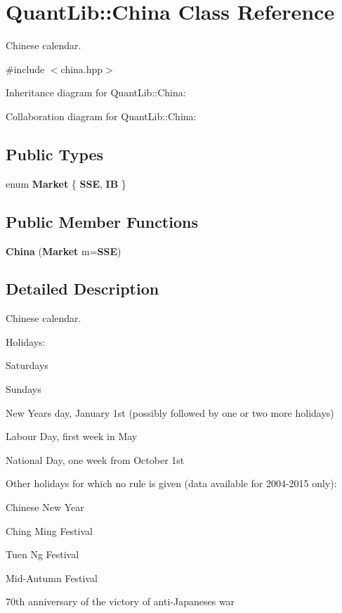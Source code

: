 \section{Quant\+Lib\+:\+:China Class Reference}
\label{class_quant_lib_1_1_china}


Chinese calendar.  




{\ttfamily \#include $<$china.\+hpp$>$}



Inheritance diagram for Quant\+Lib\+:\+:China\+:


Collaboration diagram for Quant\+Lib\+:\+:China\+:
\subsection*{Public Types}
\begin{DoxyCompactItemize}
\item 
enum {\bf Market} \{ {\bf S\+SE}, 
{\bf IB}
 \}
\end{DoxyCompactItemize}
\subsection*{Public Member Functions}
\begin{DoxyCompactItemize}
\item 
{\bf China} ({\bf Market} m={\bf S\+SE})
\end{DoxyCompactItemize}


\subsection{Detailed Description}
Chinese calendar. 

Holidays\+: 
\begin{DoxyItemize}
\item Saturdays 
\item Sundays 
\item New Year\textquotesingle{}s day, January 1st (possibly followed by one or two more holidays) 
\item Labour Day, first week in May 
\item National Day, one week from October 1st 
\end{DoxyItemize}

Other holidays for which no rule is given (data available for 2004-\/2015 only)\+: 
\begin{DoxyItemize}
\item Chinese New Year 
\item Ching Ming Festival 
\item Tuen Ng Festival 
\item Mid-\/\+Autumn Festival 
\item 70th anniversary of the victory of anti-\/\+Japaneses war 
\end{DoxyItemize}

